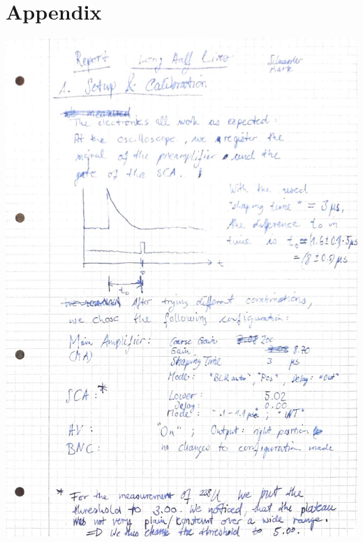 \section{Appendix}
\label{sec:appendix}
    \includegraphics[width=\linewidth]{records/page1.jpeg}
\clearpage
